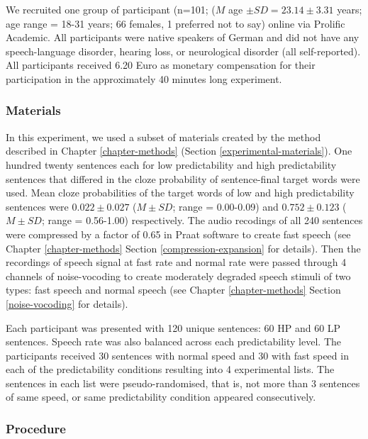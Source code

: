 \documentclass[a4paper, nobind]{templates/ociamthesis}
\begin{document}
We recruited one group of participant (n=101; (\(M\) age \(\pm SD=23.14\pm 3.31\) years; age range = 18-31 years; 66 females, 1 preferred not to say) online via Prolific Academic.
All participants were native speakers of German and did not have any speech-language disorder, hearing loss, or neurological disorder (all self-reported).
All participants received 6.20 Euro as monetary compensation for their participation in the approximately 40 minutes long experiment.

\hypertarget{materials-2}{%
\subsubsection{Materials}\label{materials-2}}

In this experiment, we used a subset of materials created by the method described in Chapter \ref{chapter-methods} (Section \ref{experimental-materials}).
One hundred twenty sentences each for low predictability and high predictability sentences that differed in the cloze probability of sentence-final target words were used.
Mean cloze probabilities of the target words of low and high predictability sentences were \(0.022\pm0.027\) (\(M\pm SD\); range = 0.00-0.09) and \(0.752\pm0.123\) (\(M\pm SD\); range = 0.56-1.00) respectively.
The audio recodings of all 240 sentences were compressed by a factor of 0.65 in Praat software to create fast speech (see Chapter \ref{chapter-methods} Section \ref{compression-expansion} for details).
Then the recordings of speech signal at fast rate and normal rate were passed through 4 channels of noise-vocoding to create moderately degraded speech stimuli of two types: fast speech and normal speech (see Chapter \ref{chapter-methods} Section \ref{noise-vocoding} for details).

Each participant was presented with 120 unique sentences: 60 HP and 60 LP sentences.
Speech rate was also balanced across each predictability level.
The participants received 30 sentences with normal speed and 30 with fast speed in each of the predictability conditions resulting into 4 experimental lists.
The sentences in each list were pseudo-randomised, that is, not more than 3 sentences of same speed, or same predictability condition appeared consecutively.

\hypertarget{procedure-3}{%
\subsubsection{Procedure}\label{procedure-3}}
\end{document}
